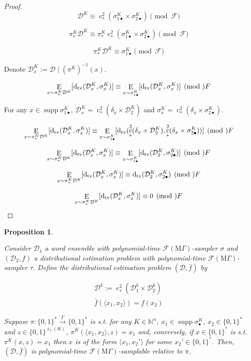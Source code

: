 \documentclass{article}
\numberwithin{equation}{section}
\theoremstyle{definition}
\theoremstyle{plain}
\newtheorem{proposition}{Proposition}[section]
\newcommand{\Bool}{\{0,1\}}
\newcommand{\Words}{{\Bool^*}}
\DeclareMathOperator{\Supp}{supp}
\DeclareMathOperator{\E}{E}
\DeclareMathOperator{\R}{r}
\DeclareMathOperator{\En}{c}
\newcommand{\Dtv}{\operatorname{d}_{\textnormal{tv}}}
\newcommand{\Nats}{\mathbb{N}}
\newcommand{\Chev}[1]{\langle #1 \rangle}
\newcommand{\Dist}{\mathcal{D}}
\newcommand{\MGrow}{\mathrm{M}\Gamma}
\newcommand{\Fall}{\mathcal{F}}
\newcommand{\EMG}{\Fall(\MGrow)}
\newcommand{\Scheme}{\xrightarrow{\Gamma}}
\begin{document}
\begin{proof}

\[\Dist^{K} \equiv \En_*^2(\sigma_{1\bullet}^K \times \sigma_{2\bullet}^K)\pmod \Fall\]

\[\pi_*^K\Dist^{K} \equiv \pi_*^K\En_*^2(\sigma_{1\bullet}^K \times \sigma_{2\bullet}^K) \pmod \Fall\] 

\[\pi_*^K\Dist^{K} \equiv  \sigma_{1\bullet}^K \pmod \Fall\]

Denote $\Dist_x^K:=\Dist \mid (\pi^K)^{-1}(x)$.

\[\E_{x \sim \pi_*^K\Dist^{K}}[\Dtv(\Dist_x^K,\sigma_x^K)] \equiv \E_{x \sim \sigma_{1\bullet}^K}[\Dtv(\Dist_x^K,\sigma_x^K)] \pmod \Fall\]

For any $x \in \Supp \sigma_{1\bullet}^{K}$, $\Dist_x^K = \En_*^2(\delta_x \times \Dist_2^{K})$ and $\sigma_x^K=\En_*^2(\delta_x \times \sigma_{2\bullet}^K)$.

\[\E_{x \sim \pi_*^K\Dist^{K}}[\Dtv(\Dist_x^K,\sigma_x^K)] \equiv \E_{x \sim \sigma_{1\bullet}^K}[\Dtv(\En_*^2(\delta_x \times \Dist_2^{K}),\En_*^2(\delta_x \times \sigma_{2\bullet}^K))] \pmod \Fall\]

\[\E_{x \sim \pi_*^K\Dist^{K}}[\Dtv(\Dist_x^K,\sigma_x^K)] \equiv \E_{x \sim \sigma_{1\bullet}^K}[\Dtv(\Dist_2^{K},\sigma_{2\bullet}^K)] \pmod \Fall\]

\[\E_{x \sim \pi_*^K\Dist^{K}}[\Dtv(\Dist_x^K,\sigma_x^K)] \equiv \Dtv(\Dist_2^{K},\sigma_{2\bullet}^K) \pmod \Fall\]

\[\E_{x \sim \pi_*^K\Dist^{K}}[\Dtv(\Dist_x^K,\sigma_x^K)] \equiv 0 \pmod \Fall\]
\end{proof}

\begin{samepage}
\begin{proposition}
\label{prp:thm__mult__cond3}

Consider $\Dist_1$ a word ensemble with polynomial-time $\EMG$-sampler $\sigma$ and $(\Dist_2, f)$ a distributional estimation problem with polynomial-time $\EMG$-sampler $\tau$. Define the distributional estimation problem $(\Dist,\bar{f})$ by 

\begin{align*}
\Dist^k:=\En_*^2(\Dist_1^k \times \Dist_2^k)\\
\bar{f}(\Chev{x_1,x_2})=f(x_2)
\end{align*}

Suppose $\pi: \Words \Scheme \Words$ is s.t. for any $K \in \Nats^n$, ${x_1 \in \Supp \sigma_{\bullet}^{K}}$, ${x_2 \in \Words}$ and $z \in \Bool^{\R_\pi(K)}$, $\pi^{K}(\Chev{x_1,x_2},z)=x_1$ and, conversely, if ${x \in \Words}$ is s.t. ${\pi^K(x,z)=x_1}$ then ${x}$ is of the form ${\Chev{x_1,x_2'}}$ for some ${x_2' \in \Words}$. Then, $(\Dist,\bar{f})$ is polynomial-time $\EMG$-samplable relative to $\pi$.

\end{proposition}
\end{samepage}
\end{document}

